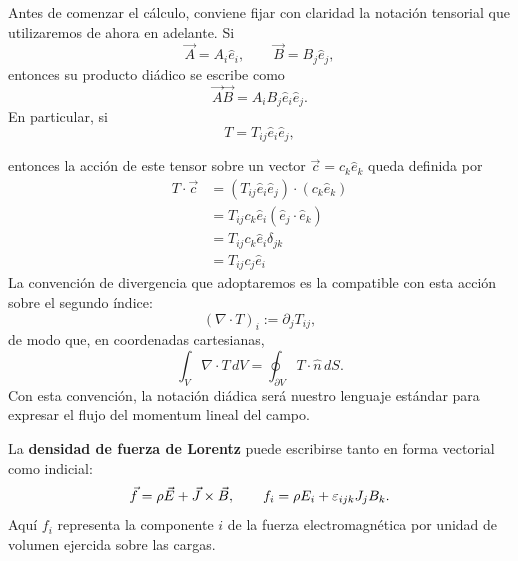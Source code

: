 \documentclass[../main.tex]{subfiles}
\begin{document}
Antes de comenzar el cálculo, conviene fijar con claridad la notación tensorial que utilizaremos de ahora en adelante. Si
\begin{equation*}
    \vec A=A_i\hat e_i,
    \qquad
    \vec B=B_j\hat e_j,
\end{equation*}
entonces su producto diádico se escribe como
\begin{equation*}
    \vec A\vec B=A_iB_j\hat e_i\hat e_j.
\end{equation*}
En particular, si
\begin{equation*}
   T=T_{ij}\hat e_i\hat e_j,
\end{equation*}

entonces la acción de este tensor sobre un vector $\vec c=c_k\hat e_k$ queda definida por
\begin{align*}
    T\cdot\vec c&=(T_{ij}\hat e_i\hat e_j)\cdot (c_k\hat e_k)\\
    &=T_{ij}c_k\hat e_i(\hat e_j\cdot \hat e_k)\\
    &=T_{ij}c_k\hat e_i\delta_{jk} \\
    &=T_{ij}c_j\hat e_i
\end{align*}
La convención de divergencia que adoptaremos es la compatible con esta acción sobre el segundo índice:
\begin{equation*}
    (\nabla\cdot T)_i:=\partial_jT_{ij},
\end{equation*}
de modo que, en coordenadas cartesianas,
\begin{equation*}
    \int_V \nabla\cdot T\,dV=\oint_{\partial V}T\cdot\hat n\,dS.
\end{equation*}
Con esta convención, la notación diádica será nuestro lenguaje estándar para expresar el flujo del momentum lineal del campo.

La \textbf{densidad de fuerza de Lorentz} puede escribirse tanto en forma vectorial como indicial:
\begin{equation}
    \vec f=\rho\vec{E}+\vec{J}\times\vec{B},
    \qquad
    f_i=\rho E_i+\varepsilon_{ijk}J_jB_k.
    \label{eq:momentum-lorentz-density}
\end{equation}
Aquí $f_i$ representa la componente $i$ de la fuerza electromagnética por unidad de volumen ejercida sobre las cargas.
\end{document}
